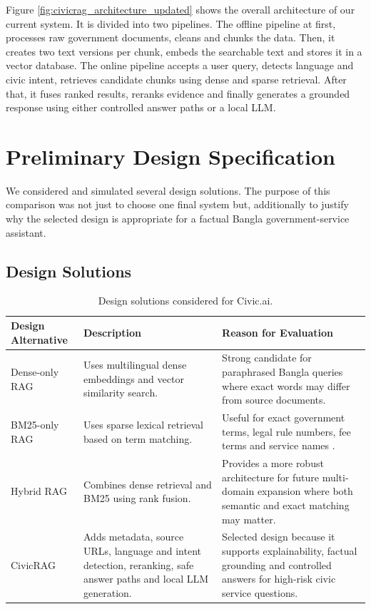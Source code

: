Figure \ref{fig:civicrag_architecture_updated} shows the overall architecture of our current system. It is divided into two pipelines. The offline pipeline at first, processes raw government documents, cleans and chunks the data. Then, it creates two text versions per chunk, embeds the searchable text and stores it in a vector database. The online pipeline accepts a user query, detects language and civic intent, retrieves candidate chunks using dense and sparse retrieval. After that, it fuses ranked results, reranks evidence and finally generates a grounded response using either controlled answer paths or a local LLM.

\section{Preliminary Design Specification}

We considered and simulated several design solutions. The purpose of this comparison was not just to choose one final system but, additionally to justify why the selected design is appropriate for a factual Bangla government-service assistant.

\subsection{Design Solutions}

\begin{table}[h]
\centering
\caption{Design solutions considered for Civic.ai.}
\begin{tabular}{|p{3.2cm}|p{5.4cm}|p{5.2cm}|}
\hline
\textbf{Design Alternative} & \textbf{Description} & \textbf{Reason for Evaluation} \\
\hline
Dense-only RAG & Uses multilingual dense embeddings and vector similarity search. & Strong candidate for paraphrased Bangla queries where exact words may differ from source documents. \\
\hline
BM25-only RAG & Uses sparse lexical retrieval based on term matching. & Useful for exact government terms, legal rule numbers, fee terms and service names \cite{robertson2009bm25}. \\
\hline
Hybrid RAG & Combines dense retrieval and BM25 using rank fusion. & Provides a more robust architecture for future multi-domain expansion where both semantic and exact matching may matter. \\
\hline
CivicRAG & Adds metadata, source URLs, language and intent detection, reranking, safe answer paths and local LLM generation. & Selected design because it supports explainability, factual grounding and controlled answers for high-risk civic service questions. \\
\hline
\end{tabular}
\end{table}

